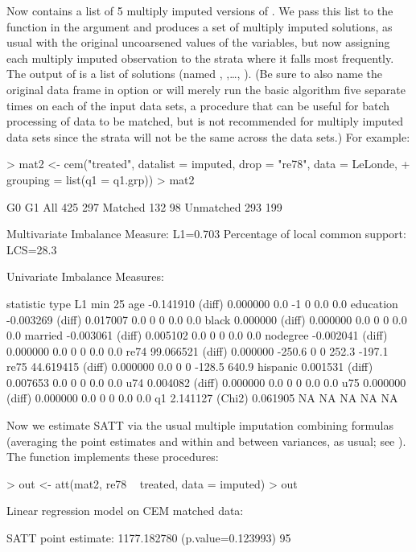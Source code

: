 \documentclass[article]{jss}
\begin{document}
Now  contains a list of 5 multiply imputed versions of
.  We pass this list to the  function in the argument
 and  produces a set of multiply imputed
solutions, as usual with the original uncoarsened values of the
variables, but now assigning each multiply imputed observation to the
strata where it falls most frequently.  The output of  is a
list of  solutions (named ,
,\dots, ).  (Be sure to also name the
original data frame in option  or  will merely
run the basic algorithm five separate times on each of the input data
sets, a procedure that can be useful for batch processing of data to
be matched, but is not recommended for multiply imputed data sets
since the strata will not be the same across the data sets.)  For
example:
\begin{Schunk}
\begin{Sinput}
> mat2 <- cem("treated", datalist = imputed, drop = "re78", data = LeLonde, 
+     grouping = list(q1 = q1.grp))
> mat2
\end{Sinput}
\begin{Soutput}
           G0  G1
All       425 297
Matched   132  98
Unmatched 293 199


Multivariate Imbalance Measure: L1=0.703
Percentage of local common support: LCS=28.3%

Univariate Imbalance Measures:

          statistic   type       L1    min 25%
age       -0.141910 (diff) 0.000000    0.0  -1   0    0.0    0.0
education -0.003269 (diff) 0.017007    0.0   0   0    0.0    0.0
black      0.000000 (diff) 0.000000    0.0   0   0    0.0    0.0
married   -0.003061 (diff) 0.005102    0.0   0   0    0.0    0.0
nodegree  -0.002041 (diff) 0.000000    0.0   0   0    0.0    0.0
re74      99.066521 (diff) 0.000000 -250.6   0   0  252.3 -197.1
re75      44.619415 (diff) 0.000000    0.0   0   0 -128.5  640.9
hispanic   0.001531 (diff) 0.007653    0.0   0   0    0.0    0.0
u74        0.004082 (diff) 0.000000    0.0   0   0    0.0    0.0
u75        0.000000 (diff) 0.000000    0.0   0   0    0.0    0.0
q1         2.141127 (Chi2) 0.061905     NA  NA  NA     NA     NA
\end{Soutput}
\end{Schunk}

Now we estimate SATT via the usual multiple imputation combining
formulas (averaging the point estimates and within and between
variances, as usual; see \citep{KinHonJos01}).  The function
 implements these procedures:
\begin{Schunk}
\begin{Sinput}
> out <- att(mat2, re78 ~ treated, data = imputed)
> out
\end{Sinput}
\begin{Soutput}
Linear regression model on CEM matched data:

SATT point estimate: 1177.182780 (p.value=0.123993)
95%
\end{Soutput}
\end{Schunk}
\end{document}
